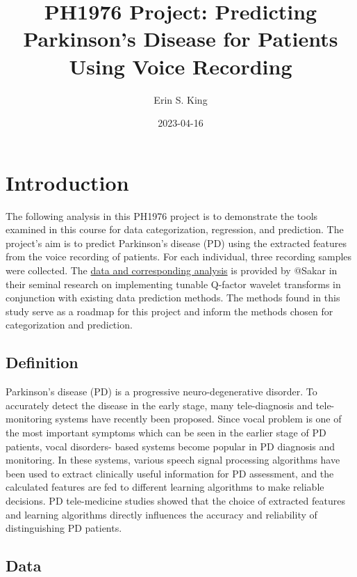 \documentclass[
]{article}
\title{PH1976 Project: Predicting Parkinson's Disease for Patients Using Voice Recording}
\author{Erin S. King}
\date{2023-04-16}
\begin{document}
\maketitle

{
\setcounter{tocdepth}{2}
\tableofcontents
}
\hypertarget{introduction}{%
\section{Introduction}\label{introduction}}

The following analysis in this PH1976 project is to demonstrate the tools examined in this course for data categorization, regression, and prediction. The project's aim is to predict Parkinson's disease (PD) using the extracted features from the voice recording of patients. For each individual, three recording samples were collected. The \href{https://doi.org/10.1016/j.asoc.2018.10.022}{data and corresponding analysis} is provided by @Sakar in their seminal research on implementing tunable Q-factor wavelet transforms in conjunction with existing data prediction methods. The methods found in this study serve as a roadmap for this project and inform the methods chosen for categorization and prediction.

\hypertarget{definition}{%
\subsection{Definition}\label{definition}}

Parkinson's disease (PD) is a progressive neuro-degenerative disorder. To accurately detect the disease in the
early stage, many tele-diagnosis and tele-monitoring systems have recently been proposed. Since vocal problem is one of the most important symptoms which can be seen in the earlier stage of PD patients, vocal disorders-
based systems become popular in PD diagnosis and monitoring. In these systems, various speech signal processing algorithms have been used to extract clinically useful information for PD assessment, and the
calculated features are fed to different learning algorithms to make reliable decisions. PD tele-medicine studies showed that the choice of extracted features and learning algorithms directly influences the accuracy and
reliability of distinguishing PD patients.

\hypertarget{data}{%
\subsection{Data}\label{data}}
\end{document}
